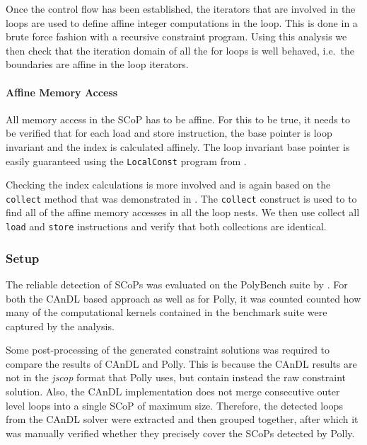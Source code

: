     Once the control flow has been established, the iterators that are
    involved in the loops are used to define affine integer computations in the
    loop.
    This is done in a brute force fashion with a recursive constraint program.
    Using this analysis we then check that the iteration domain of all the for
    loops is well behaved, i.e.\ the boundaries are affine in the loop
    iterators.

    \paragraph*{Affine Memory Access}
    All memory access in the SCoP has to be affine.
    For this to be true, it needs to be verified that for each load and store
    instruction, the base pointer is loop invariant and the index is calculated
    affinely.
    The loop invariant base pointer is easily guaranteed using the
    \texttt{LocalConst} program from .

    Checking the index calculations is more involved and is again based on the
    \texttt{collect} method that was demonstrated in .
    The \texttt{collect} construct is used to to find all of the affine memory
    accesses in all the loop nests.
    We then use collect all \texttt{load} and \texttt{store} instructions and
    verify that both collections are identical.

\pagebreak
\phantom{placeholder}
\pagebreak

\subsubsection{Setup}

    The reliable detection of SCoPs was evaluated on the PolyBench suite by
    \citet{polybench}.
    For both the CAnDL based approach as well as for Polly, it was counted
    counted how many of the computational kernels contained in the benchmark
    suite were captured by the analysis.

    Some post-processing of the generated constraint solutions was required to
    compare the results of CAnDL and Polly.
    This is because the CAnDL results are not in the {\it jscop} format that
    Polly uses, but contain instead the raw constraint solution.
    Also, the CAnDL implementation does not merge consecutive outer level loops
    into a single SCoP of maximum size.
    Therefore, the detected loops from the CAnDL solver were extracted and then
    grouped together, after which it was manually verified whether they
    precisely cover the SCoPs detected by Polly.

